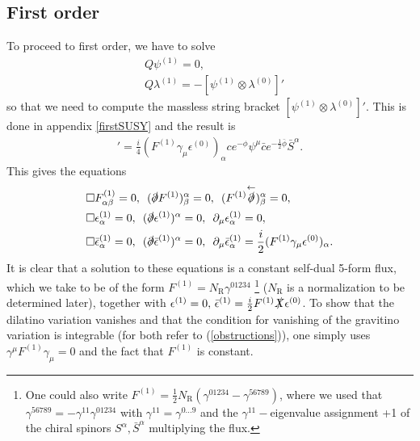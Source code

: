 \documentclass[12pt]{article}
\def\be{\begin{equation}}
\def\ee{\end{equation}}
\numberwithin{equation}{section}
\newcommand{\B}[1]{\bar{#1}}
\begin{document}
\subsection{First order}
\label{firstOrd}
To proceed to first order, we have to solve
\be
\begin{aligned}
	&Q \psi^{(1)} = 0, \\
	&Q \lambda^{(1)} = -[\psi^{(1)} \otimes \lambda^{(0)}]'
\end{aligned}
\ee
so that we need to compute the massless string bracket $[\psi^{(1)} \otimes \lambda^{(0)}]'$. This is done in appendix \ref{firstSUSY} and the result is
\begin{align}
    [\psi^{(1)} \otimes \lambda^{(0)} ]' = \frac{i}{4} (F^{(1)}\gamma_{\mu}\epsilon^{(0)})_{\alpha}ce^{-\phi}\psi^{\mu}\bar{c}e^{-\frac{1}{2}\B{\phi}}\B{S}^{\alpha}.
\end{align}
This gives the equations
\be
\begin{aligned}
	&\Box F^{(1)}_{\alpha\beta}=0,\,\,\,(\slashed{\partial}F^{(1)})^\alpha_\beta = 0, \,\,\, (F^{(1)} \overset{\leftarrow}{\slashed{\partial}})^\alpha_\beta = 0,\\
	& \Box \epsilon^{(1)}_\alpha = 0, \,\,\, (\slashed{\partial} \epsilon^{(1)})^\alpha = 0, \,\,\, \partial_\mu \epsilon^{(1)}_\alpha = 0 ,\\
	& \Box \bar{\epsilon}^{(1)}_\alpha = 0, \,\,\, (\slashed{\partial} \bar{\epsilon}^{(1)})^\alpha = 0, \,\,\, \partial_\mu \bar{\epsilon}^{(1)}_\alpha = \frac{i}{2} (F^{(1)} \gamma_\mu \epsilon^{(0)})_\alpha.
	\label{eqFirst}
\end{aligned}
\ee
It is clear that a solution to these equations is a constant self-dual 5-form flux, which we take to be of the form $F^{(1)} = N_{\text{R}} \gamma^{01234}$ \footnote{One could also write $F^{(1)} = \frac{1}{2} N_{\text{R}} (\gamma^{01234} - \gamma^{56789})$, where we used that $\gamma^{56789} = -\gamma^{11} \gamma^{01234}$ with $\gamma^{11} = \gamma^{0\ldots9}$ and the $\gamma^{11}-$eigenvalue assignment +1 of the chiral spinors $S^\alpha, \bar{S}^\alpha$ multiplying the flux.} ($N_{\text{R}}$ is a normalization to be determined later), together with $\epsilon^{(1)} = 0,\, \bar{\epsilon}^{(1)} = \frac{i}{2} F^{(1)} \slashed{X} \epsilon^{(0)}$. To show that the dilatino variation vanishes and that the condition for vanishing of the gravitino variation is integrable (for both refer to (\ref{obstructions})), one simply uses $\gamma^\mu F^{(1)} \gamma_\mu = 0$ and the fact that $F^{(1)}$ is constant.
\end{document}
